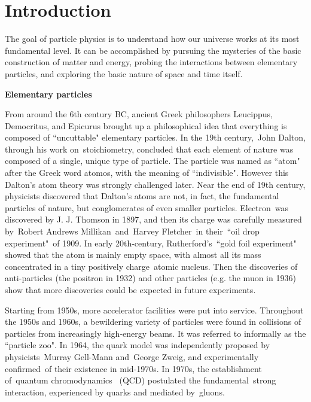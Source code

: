 
\chapter{Introduction}

The goal of particle physics is to understand how our universe works at its most fundamental level. It can be accomplished by pursuing the mysteries of the basic construction of matter and energy, probing the interactions between elementary particles, and exploring the basic nature of space and time itself. 

\textbf{Elementary particles}

From around the 6th century BC, ancient Greek philosophers Leucippus, Democritus, and Epicurus brought up a philosophical idea that everything is composed of ``uncuttable" elementary particles. 
In the 19th century, John Dalton, through his work on stoichiometry, concluded that each element of nature was composed of a single, unique type of particle. 
The particle was named as ``atom" after the Greek word atomos, with the meaning of ``indivisible". 
However this Dalton's atom theory was strongly challenged later. Near the end of 19th century, physicists discovered that Dalton's atoms are not, in fact, the fundamental particles of nature, 
but conglomerates of even smaller particles. 
Electron was discovered by J. J. Thomson in 1897, and then its charge was carefully measured by Robert Andrews Millikan and Harvey Fletcher in their ``oil drop experiment" of 1909. 
In early 20th-century, Rutherford's ``gold foil experiment" showed that the atom is mainly empty space, with almost all its mass concentrated in a tiny positively charge atomic nucleus. 
Then the discoveries of anti-particles (the positron in 1932) and other particles (e.g. the muon in 1936) show that more discoveries could be expected in future experiments.

Starting from 1950s, more accelerator facilities were put into service. 
Throughout the 1950s and 1960s, a bewildering variety of particles were found in collisions of particles from increasingly high-energy beams. 
It was referred to informally as the ``particle zoo".
In 1964, the quark model was independently proposed by physicists Murray Gell-Mann and George Zweig, and experimentally confirmed of their existence in mid-1970s. 
In 1970s, the establishment of quantum chromodynamics  (QCD) postulated the fundamental strong interaction, experienced by quarks and mediated by gluons.

